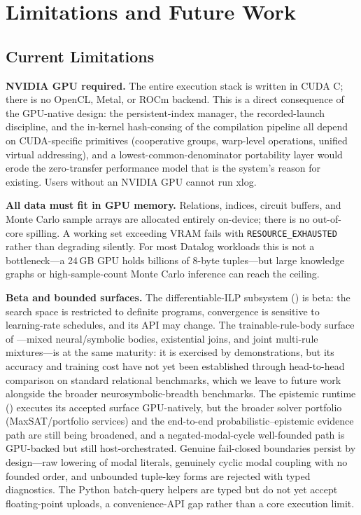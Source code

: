 \section{Limitations and Future Work}\label{sec:limits}

\subsection{Current Limitations}

\textbf{NVIDIA GPU required.} The entire execution stack is written in CUDA C; there is no OpenCL, Metal, or ROCm backend. This is a direct consequence of the GPU-native design: the persistent-index manager, the recorded-launch discipline, and the in-kernel hash-consing of the compilation pipeline all depend on CUDA-specific primitives (cooperative groups, warp-level operations, unified virtual addressing), and a lowest-common-denominator portability layer would erode the zero-transfer performance model that is the system's reason for existing. Users without an NVIDIA GPU cannot run xlog.

\textbf{All data must fit in GPU memory.} Relations, indices, circuit buffers, and Monte Carlo sample arrays are allocated entirely on-device; there is no out-of-core spilling. A working set exceeding VRAM fails with \texttt{RESOURCE\_EXHAUSTED} rather than degrading silently. For most Datalog workloads this is not a bottleneck---a 24\,GB GPU holds billions of 8-byte tuples---but large knowledge graphs or high-sample-count Monte Carlo inference can reach the ceiling.

\textbf{Beta and bounded surfaces.} The differentiable-ILP subsystem () is beta: the search space is restricted to definite programs, convergence is sensitive to learning-rate schedules, and its API may change. The trainable-rule-body surface of ---mixed neural/symbolic bodies, existential joins, and joint multi-rule mixtures---is at the same maturity: it is exercised by demonstrations, but its accuracy and training cost have not yet been established through head-to-head comparison on standard relational benchmarks, which we leave to future work alongside the broader neurosymbolic-breadth benchmarks. The epistemic runtime () executes its accepted surface GPU-natively, but the broader solver portfolio (MaxSAT/portfolio services) and the end-to-end probabilistic--epistemic evidence path are still being broadened, and a negated-modal-cycle well-founded path is GPU-backed but still host-orchestrated. Genuine fail-closed boundaries persist by design---raw lowering of modal literals, genuinely cyclic modal coupling with no founded order, and unbounded tuple-key forms are rejected with typed diagnostics. The Python batch-query helpers are typed but do not yet accept floating-point uploads, a convenience-API gap rather than a core execution limit.

